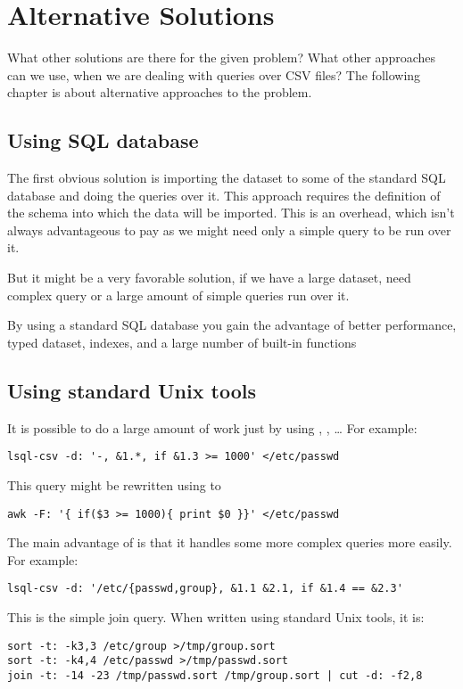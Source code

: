
\chapter{Alternative Solutions}
What other solutions are there for the given problem? What other approaches can we use, when we are dealing with queries over CSV files? 
The following chapter is about alternative approaches to the problem.

\section{Using SQL database}
The first obvious solution is importing the dataset to some of the standard SQL database and doing the queries over it. 
This approach requires the definition of the schema into which the data will be imported. This is an overhead, which isn't
always advantageous to pay as we might need only a simple query to be run over it.

But it might be a very favorable solution, if we have a large dataset, need complex query or a large amount of simple queries run over it.

By using a standard SQL database you gain the advantage of better performance, typed dataset, indexes, and a large number of built-in functions

\section{Using standard Unix tools}
It is possible to do a large amount of work just by using , , \ldots{}
For example:

\begin{verbatim}
lsql-csv -d: '-, &1.*, if &1.3 >= 1000' </etc/passwd
\end{verbatim}

This query might be rewritten using  to
\begin{verbatim}
awk -F: '{ if($3 >= 1000){ print $0 }}' </etc/passwd
\end{verbatim}

The main advantage of  is that it handles some more complex queries more easily. For example:
\begin{verbatim}
lsql-csv -d: '/etc/{passwd,group}, &1.1 &2.1, if &1.4 == &2.3'
\end{verbatim}

This is the simple join query. When written using standard Unix tools, it is:
\begin{verbatim}
sort -t: -k3,3 /etc/group >/tmp/group.sort
sort -t: -k4,4 /etc/passwd >/tmp/passwd.sort
join -t: -14 -23 /tmp/passwd.sort /tmp/group.sort | cut -d: -f2,8 
\end{verbatim}

